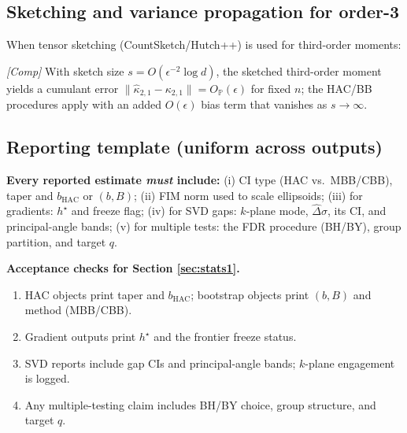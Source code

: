 \subsection{Sketching and variance propagation for order-3}\label{subsec:sketch}

When tensor sketching (CountSketch/Hutch++) is used for third-order moments:

\begin{lemma}\label{lem:sketch}
\emph{[\textup{Comp}]}
With sketch size $s=O(\epsilon^{-2}\log d)$, the sketched third-order moment yields a cumulant error $\|\widehat\kappa_{2,1}-\kappa_{2,1}\|=O_{\mathbb P}(\epsilon)$ for fixed $n$; the HAC/BB procedures apply with an added $O(\epsilon)$ bias term that vanishes as $s\to\infty$.
\end{lemma}

\subsection{Reporting template (uniform across outputs)}\label{subsec:report}

\begin{mdframed}
\textbf{Every reported estimate \emph{must} include:}
(i) CI type (HAC vs.\ MBB/CBB), taper and $b_{\mathrm{HAC}}$ or $(b,B)$;
(ii) FIM norm used to scale ellipsoids;
(iii) for gradients: $h^\star$ and freeze flag;
(iv) for SVD gaps: $k$-plane mode, $\widehat\Delta\sigma$, its CI, and principal-angle bands; 
(v) for multiple tests: the FDR procedure (BH/BY), group partition, and target $q$.
\end{mdframed}

\begin{mdframed}
\textbf{Acceptance checks for Section \ref{sec:stats1}.}
\begin{enumerate}[leftmargin=*]
\item HAC objects print taper and $b_{\mathrm{HAC}}$; bootstrap objects print $(b,B)$ and method (MBB/CBB).
\item Gradient outputs print $h^\star$ and the frontier freeze status.
\item SVD reports include gap CIs and principal-angle bands; $k$-plane engagement is logged.
\item Any multiple-testing claim includes BH/BY choice, group structure, and target $q$.
\end{enumerate}
\end{mdframed}

